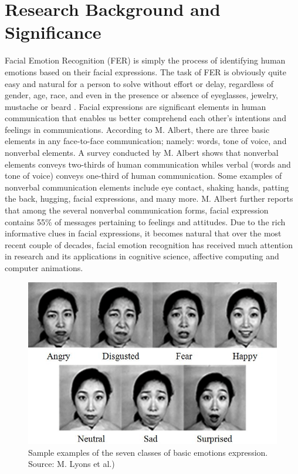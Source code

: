 \documentclass[master]{thesis-uestc}
\begin{document}
\section{Research Background and Significance}
Facial Emotion Recognition (FER) is simply the process of identifying human emotions based on their facial expressions. The task of FER is obviously quite easy and natural for a person to solve without effort or delay, regardless of gender, age, race, and even in the presence or absence of eyeglasses, jewelry, mustache or beard . Facial expressions are significant elements in human communication that enables us better comprehend each other's intentions and feelings in communications. According to M. Albert, there are three basic elements in any face-to-face communication; namely: words, tone of voice, and nonverbal elements. A survey conducted by M. Albert shows that nonverbal elements conveys two-thirds of human communication whiles verbal (words and tone of voice) conveys one-third of human communication. Some examples of nonverbal communication elements include eye contact, shaking hands, patting the back, hugging, facial expressions, and many more. M. Albert further reports that among the several nonverbal communication forms, facial expression contains 55\% of messages pertaining to feelings and attitudes. Due to the rich informative clues in facial expressions, it becomes natural that over the most recent couple of decades, facial emotion recognition has received much attention in research and its applications in cognitive science, affective computing and computer animations.

\begin{figure}[ht]
\includegraphics[width=5in]{pic/7_basic_emotions.png}
\caption{Sample examples of the seven classes of basic emotions expression. Source: M. Lyons et al.)}
\label{7_basic_emotions}
\end{figure}
\end{document}
